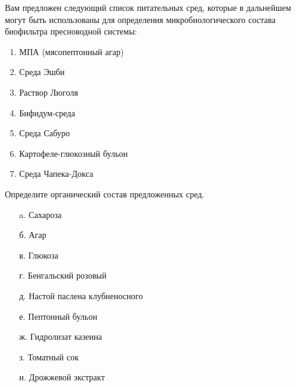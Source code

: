 
Вам предложен следующий список питательных сред, которые в дальнейшем могут быть использованы для определения микробиологического состава биофильтра пресноводной системы:

\begin{enumerate}
    \item МПА (мясопептонный агар)
    \item Среда Эшби
    \item Раствор Люголя
    \item Бифидум-среда
    \item Среда Сабуро
    \item Картофеле-глюкозный бульон
    \item Среда Чапека-Докса
\end{enumerate}

Определите органический состав предложенных сред.  

\begin{enumerate}
    \item[a.] Сахароза
    \item[б.] Агар
    \item[в.] Глюкоза
    \item[г.] Бенгальский розовый
    \item[д.] Настой паслена клубненосного
    \item[е.] Пептонный бульон
    \item[ж.] Гидролизат казеина
    \item[з.] Томатный сок
    \item[и.] Дрожжевой экстракт
\end{enumerate}